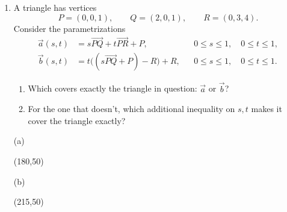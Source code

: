 \documentclass[12pt]{exam}
\begin{document}
\begin{enumerate}
\item A triangle has vertices
\[
P=(0,0,1),\qquad Q=(2,0,1),\qquad R=(0,3,4).
\]
Consider the parametrizations
\[
\begin{aligned}
\vec a(s,t)&=s\vec{PQ}+t\vec{PR}+P,
&&0\leq s\leq1,\quad0\leq t\leq1,\\
\vec b(s,t)&=t\bigl((s\vec{PQ}+P)-R\bigr)+R,
&&0\leq s\leq1,\quad0\leq t\leq1.
\end{aligned}
\]
\begin{enumerate}[label=(\alph*),itemsep=5pt]
\item Which covers exactly the triangle in question: $\vec a$ or
$\vec b$?
\item For the one that doesn't, which additional inequality on \(s,t\) makes it cover the triangle exactly?
\end{enumerate}

\vfill
\begin{flushright}
\begin{minipage}{0.38\linewidth}
\centering
(a)\par\smallskip
\framebox(180,50){}
\end{minipage}\hspace{0.4cm}
\begin{minipage}{0.46\linewidth}
\centering
(b)\par\smallskip
\framebox(215,50){}
\end{minipage}
\end{flushright}

\end{enumerate}
\end{document}
